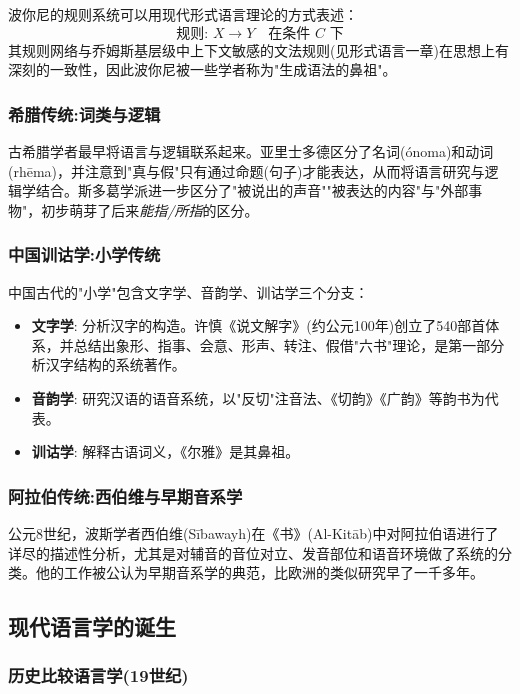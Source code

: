 波你尼的规则系统可以用现代形式语言理论的方式表述：
\begin{equation}
    \text{规则: } X \rightarrow Y \quad \text{在条件 } C \text{ 下}
\end{equation}
其规则网络与乔姆斯基层级中上下文敏感的文法规则(见形式语言一章)在思想上有深刻的一致性，因此波你尼被一些学者称为"生成语法的鼻祖"。

\subsubsection{希腊传统:词类与逻辑}

古希腊学者最早将语言与逻辑联系起来。亚里士多德区分了名词(ónoma)和动词(rhēma)，并注意到"真与假"只有通过命题(句子)才能表达，从而将语言研究与逻辑学结合。斯多葛学派进一步区分了"被说出的声音""被表达的内容"与"外部事物"，初步萌芽了后来\emph{能指/所指}的区分。

\subsubsection{中国训诂学:小学传统}

中国古代的"小学"包含文字学、音韵学、训诂学三个分支：
\begin{itemize}
    \item \textbf{文字学}: 分析汉字的构造。许慎《说文解字》(约公元100年)创立了540部首体系，并总结出象形、指事、会意、形声、转注、假借"六书"理论，是第一部分析汉字结构的系统著作。
    \item \textbf{音韵学}: 研究汉语的语音系统，以"反切"注音法、《切韵》《广韵》等韵书为代表。
    \item \textbf{训诂学}: 解释古语词义，《尔雅》是其鼻祖。
\end{itemize}

\subsubsection{阿拉伯传统:西伯维与早期音系学}

公元8世纪，波斯学者西伯维(Sībawayh)在《书》(Al-Kitāb)中对阿拉伯语进行了详尽的描述性分析，尤其是对辅音的音位对立、发音部位和语音环境做了系统的分类。他的工作被公认为早期音系学的典范，比欧洲的类似研究早了一千多年。

\subsection{现代语言学的诞生}

\subsubsection{历史比较语言学(19世纪)}

